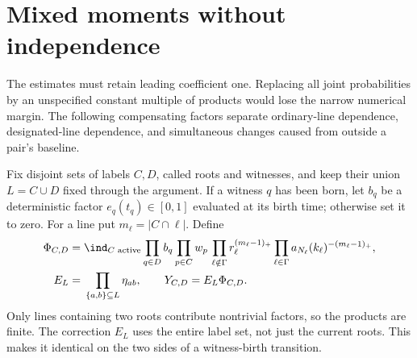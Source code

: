 \section{Mixed moments without independence}\label{sec:moments}

The estimates must retain leading coefficient one. Replacing all
joint probabilities by an unspecified constant multiple of products
would lose the narrow numerical margin. The following compensating
factors separate ordinary-line dependence, designated-line dependence,
and simultaneous changes caused from outside a pair's baseline.

Fix disjoint sets of labels \(C,D\), called roots and witnesses, and
keep their union \(L=C\cup D\) fixed through the argument. If a witness
\(q\) has been born, let \(b_q\) be a deterministic factor
\(e_q(t_q)\in[0,1]\) evaluated at its birth time; otherwise set it to
zero. For a line put \(m_\ell=|C\cap\ell|\). Define
\begin{align}
 \Phi_{C,D}={}&\ind_{C\text{ active}}
 \prod_{q\in D}b_q\prod_{p\in C}w_p\,
 \prod_{\ell\notin\Gamma}r_\ell^{(m_\ell-1)_+}
 \prod_{\ell\in\Gamma}a_{N_\ell}(k_\ell)^{-(m_\ell-1)_+},
 \label{eq:phi}\\
 E_L={}&\prod_{\{a,b\}\subseteq L}\eta_{ab},
 \qquad Y_{C,D}=E_L\Phi_{C,D}.\label{eq:etaall}
\end{align}
Only lines containing two roots contribute nontrivial factors, so the
products are finite. The correction \(E_L\) uses the entire label set,
not just the current roots. This makes it identical on the two sides
of a witness-birth transition.

